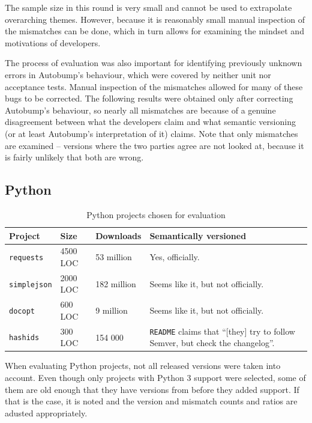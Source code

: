 \documentclass{l4proj}
\newcommand\genericstyle{\lstset{basicstyle=\ttm}}
\newcommand\codeinline[1]{{\genericstyle\lstinline!#1!}}
\begin{document}
The sample size in this round is very small and cannot be used to
extrapolate overarching themes. However, because it is reasonably
small manual inspection of the mismatches can be done, which in turn
allows for examining the mindset and motivations of developers.

The process of evaluation was also important for identifying
previously unknown errors in Autobump's behaviour, which were covered
by neither unit nor acceptance tests. Manual inspection of the
mismatches allowed for many of these bugs to be corrected. The
following results were obtained only after correcting Autobump's
behaviour, so nearly all mismatches are because of a genuine
disagreement between what the developers claim and what semantic
versioning (or at least Autobump's interpretation of it) claims. Note
that only mismatches are examined -- versions where the two parties
agree are not looked at, because it is fairly unlikely that both are
wrong.


\subsection{Python}

\begin{table}[H]
\centering
\caption{Python projects chosen for evaluation}
\label{PythonProjectsForEvaluation}
\begin{tabular}{|l|l|l|p{10cm}|}
\hline
\textbf{Project} & \textbf{Size} & \textbf{Downloads} & \textbf{Semantically versioned} \\
\hline
\codeinline{requests} & 4500 LOC & 53 million & Yes, officially. \\
\codeinline{simplejson} & 2000 LOC & 182 million & Seems like it, but not officially. \\
\codeinline{docopt} & 600 LOC & 9 million & Seems like it, but not
officially. \\
\codeinline{hashids} & 300 LOC & 154 000 & \codeinline{README} claims
that ``[they] try to follow Semver, but check the changelog''. \\
\hline
\end{tabular}
\end{table}

When evaluating Python projects, not all released versions were taken
into account. Even though only projects with Python 3 support were
selected, some of them are old enough that they have versions from
before they added support. If that is the case, it is noted and the
version and mismatch counts and ratios are adusted appropriately.
\end{document}
